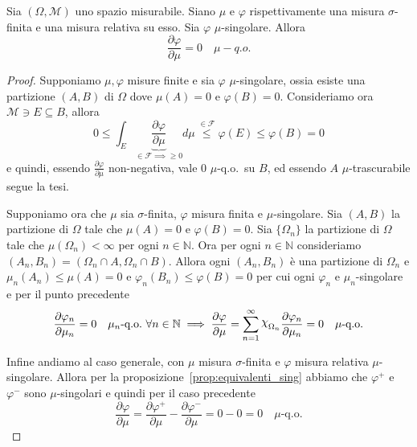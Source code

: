 \begin{theorem}\label{thm:rad_nik_singolari}
    Sia \({(\Omega, \mathcal{M})}\) uno spazio misurabile. Siano \(\mu\) e
    \(\varphi \) rispettivamente una misura \(\sigma\)-finita e una misura
    relativa su esso. Sia \(\varphi \) \(\mu\)-singolare. Allora
    \[
        \frac{\partial \varphi }{\partial \mu} = 0 \quad \mu-q.o.
    \]

\end{theorem}
\begin{proof}
    Supponiamo \(\mu, \varphi \) misure finite e sia \(\varphi \)
    \(\mu\)-singolare, ossia esiste una partizione \({(A, B)}\) di \(\Omega\)
    dove \(\mu{(A)} = 0\) e \(\varphi {(B)} = 0\). Consideriamo ora
    \(\mathcal{M} \ni E \subseteq B \), allora
    \[
        0 \le \int_E \underbrace{\frac{\partial \varphi }{\partial \mu}}_{\in
        \mathcal{F} \implies \ge 0}  d\mu \overset{\in \mathcal{F}}{\le }
        \varphi (E) \le \varphi {(B)} = 0
    \]
    e quindi, essendo \(\frac{\partial \varphi }{\partial \mu}\) non-negativa, vale
    \(0\) \(\mu\)-q.o.~su \(B\), ed essendo \(A\) \(\mu\)-trascurabile segue la
    tesi.

    Supponiamo ora che \(\mu\) sia \(\sigma\)-finita, \(\varphi \) misura finita
    e \(\mu\)-singolare. Sia \({(A, B)}\) la partizione di \(\Omega\) tale che
    \(\mu{(A)} = 0\) e \(\varphi {(B)} = 0\). Sia \(\{\Omega_n\}\) la partizione
    di \(\Omega\) tale che \(\mu{(\Omega_{n})}< \infty\) per ogni \(n \in
    \mathbb{N}\). Ora per ogni \(n \in \mathbb{N}\) consideriamo \({(A_{n},
    B_{n})} = {(\Omega_{n} \cap A, \Omega_{n} \cap B)}\). Allora ogni \({(A_{n},
B_{n})}\) è una partizione di \(\Omega_{n}\) e \(\mu_n{(A_{n})} \le \mu{(A)} =0\)
e \(\varphi_n {(B_{n})} \le \varphi {(B)} = 0\) per cui ogni \(\varphi _n\) e
\(\mu_{n}\)-singolare e per il punto precedente 
\[
    \frac{\partial \varphi_n }{\partial \mu_n} = 0 \quad \mu_n\text{-q.o.} \,\, \forall
    n \in \mathbb{N}\implies \frac{\partial \varphi }{\partial \mu} =
    \sum_{n=1}^{\infty} \rchi_{\Omega_n} \frac{\partial \varphi _n}{\partial
    \mu_{n}} = 0 \quad \mu\text{-q.o.}
\]
    
    Infine andiamo al caso generale, con \(\mu\) misura \(\sigma\)-finita e
    \(\varphi \) misura relativa \(\mu\)-singolare. Allora per la
    proposizione~\ref{prop:equivalenti_sing} abbiamo che \(\varphi^{+}\) e
    \(\varphi^{-}\) sono \(\mu\)-singolari e quindi per il caso precedente
    \[
        \frac{\partial \varphi }{\partial \mu} = \frac{\partial
        \varphi^{+}}{\partial \mu} - \frac{\partial \varphi^{-}}{\partial \mu} =
        0 - 0 = 0 \quad \mu\text{-q.o.}
    \]

\end{proof}

